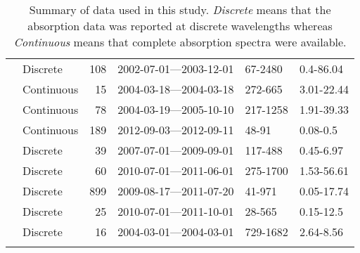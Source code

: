 \begin{longtable}{llrcll}
  \citet{Spencer2007, Spencer2007a} & Discrete & 108 & 2002-07-01---2003-12-01 & 67-2480 & 0.4-86.04 \\ 
  \citet{Stedmon2007a} & Continuous &  15 & 2004-03-18---2004-03-18 & 272-665 & 3.01-22.44 \\ 
  \citet{Stedmon2011} & Continuous &  78 & 2004-03-19---2005-10-10 & 217-1258 & 1.91-39.33 \\ 
  \citet{Stedmon2015} & Continuous & 189 & 2012-09-03---2012-09-11 & 48-91 & 0.08-0.5 \\ 
  \citet{Tehrani2013} & Discrete &  39 & 2007-07-01---2009-09-01 & 117-488 & 0.45-6.97 \\ 
  \citet{Wagner2015} & Discrete &  60 & 2010-07-01---2011-06-01 & 275-1700 & 1.53-56.61 \\ 
  \citet{Werdell2003} & Discrete & 899 & 2009-08-17---2011-07-20 & 41-971 & 0.05-17.74 \\ 
  \citet{Yang2013a} & Discrete &  25 & 2010-07-01---2011-10-01 & 28-565 & 0.15-12.5 \\ 
  \citet{Zhang2005} & Discrete &  16 & 2004-03-01---2004-03-01 & 729-1682 & 2.64-8.56 \\ 
   \hline
\hline
\caption{Summary of data used in this study. \textit{Discrete} means that the 
absorption data was reported at discrete wavelengths whereas 
\textit{Continuous} means that complete absorption spectra were available.} 
\end{longtable}
\endgroup
